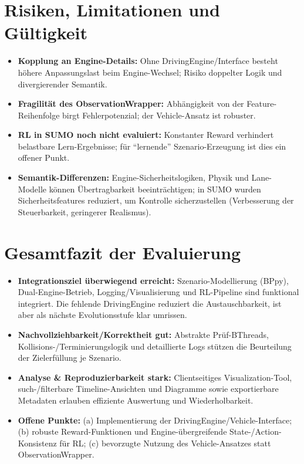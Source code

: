\section{Risiken, Limitationen und Gültigkeit}
\begin{itemize}
  \item \textbf{Kopplung an Engine-Details:} Ohne DrivingEngine/Interface besteht höhere Anpassungslast beim Engine-Wechsel; Risiko doppelter Logik und divergierender Semantik.
  \item \textbf{Fragilität des ObservationWrapper:} Abhängigkeit von der Feature-Reihenfolge birgt Fehlerpotenzial; der Vehicle-Ansatz ist robuster.
  \item \textbf{RL in SUMO noch nicht evaluiert:} Konstanter Reward verhindert belastbare Lern-Ergebnisse; für \enquote{lernende} Szenario-Erzeugung ist dies ein offener Punkt.
  \item \textbf{Semantik-Differenzen:} Engine-Sicherheitslogiken, Physik und Lane-Modelle können Übertragbarkeit beeinträchtigen; in SUMO wurden Sicherheitsfeatures reduziert, um Kontrolle sicherzustellen (Verbesserung der Steuerbarkeit, geringerer Realismus).
\end{itemize}

\section{Gesamtfazit der Evaluierung}
\begin{itemize}
  \item \textbf{Integrationsziel überwiegend erreicht:} Szenario-Modellierung (BPpy), Dual-Engine-Betrieb, Logging/Visualisierung und RL-Pipeline sind funktional integriert. Die fehlende DrivingEngine reduziert die Austauschbarkeit, ist aber als nächste Evolutionsstufe klar umrissen.
  \item \textbf{Nachvollziehbarkeit/Korrektheit gut:} Abstrakte Prüf-BThreads, Kollisions-/Terminierungslogik und detaillierte Logs stützen die Beurteilung der Zielerfüllung je Szenario.
  \item \textbf{Analyse \& Reproduzierbarkeit stark:} Clientseitiges Visualization-Tool, such-/filterbare Timeline-Ansichten und Diagramme sowie exportierbare Metadaten erlauben effiziente Auswertung und Wiederholbarkeit.
  \item \textbf{Offene Punkte:} (a) Implementierung der DrivingEngine/Vehicle-Interface; (b) robuste Reward-Funktionen und Engine-übergreifende State-/Action-Konsistenz für RL; (c) bevorzugte Nutzung des Vehicle-Ansatzes statt ObservationWrapper.
\end{itemize}

